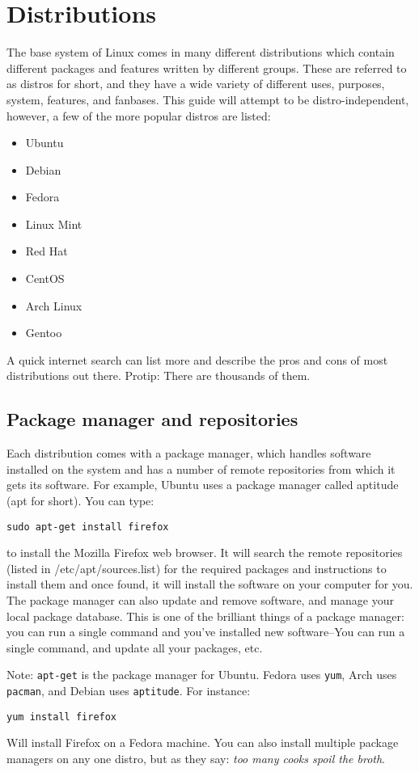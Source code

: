 \documentclass{article}
\begin{document}
\section{Distributions}
The base system of Linux comes in many different distributions which contain different packages and features written by different groups. These are referred to as distros for short, and they have a wide variety of different uses, purposes, system, features, and fanbases.
This guide will attempt to be distro-independent, however, a few of the more popular distros are listed:
\begin{itemize}
\item Ubuntu
\item Debian
\item Fedora
\item Linux Mint
\item Red Hat
\item CentOS
\item Arch Linux
\item Gentoo
\end{itemize}
A quick internet search can list more and describe the pros and cons of most distributions out there. Protip: There are thousands of them.

\subsection{Package manager and repositories}
Each distribution comes with a package manager, which handles software installed on the system and has a number of remote repositories from which it gets its software. For example, Ubuntu uses a package manager called aptitude (apt for short). You can type:
\begin{verbatim}
sudo apt-get install firefox
\end{verbatim}
to install the Mozilla Firefox web browser. It will search the remote repositories (listed in /etc/apt/sources.list) for the required packages and instructions to install them and once found, it will install the software on your computer for you. The package manager can also update and remove software, and manage your local package database. This is one of the brilliant things of a package manager: you can run a single command and you've installed new software--You can run a single command, and update all your packages, etc.

Note: \texttt{apt-get} is the package manager for Ubuntu. Fedora uses \texttt{yum}, Arch uses \texttt{pacman}, and Debian uses \texttt{aptitude}. For instance:
\begin{verbatim}
yum install firefox
\end{verbatim}
Will install Firefox on a Fedora machine.
You can also install multiple package managers on any one distro, but as they say: \emph{too many cooks spoil the broth}.
\end{document}
